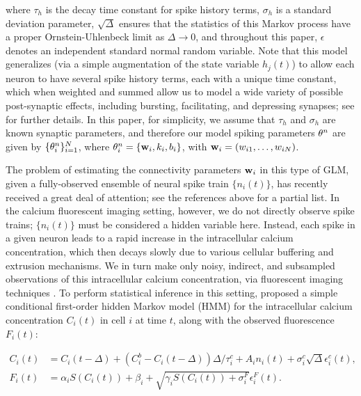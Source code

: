 where $\tau_h$ is the decay time constant for spike history terms, $\sigma_h$ is a standard deviation parameter, $\sqrt{\Delta}$ ensures that the statistics of this Markov process have a proper Ornstein-Uhlenbeck limit as $\Delta \to 0$, and throughout this paper, $\epsilon$ denotes an independent standard normal random variable. Note that this model generalizes (via a simple augmentation of the state variable $h_j(t)$) to allow each neuron to have several spike history terms, each with a unique time constant, which when weighted and summed allow us to model a wide variety of possible post-synaptic effects, including bursting, facilitating, and depressing synapses; see \cite{Vogelstein2009} for further details. In this paper, for simplicity, we assume that $\tau_h$ and $\sigma_h$ are known synaptic parameters, and therefore our model spiking parameters $\mathbf{\theta}^n$ are given by $\{\mathbf{\theta}^n_i\}_{i=1}^N$, where $\mathbf{\theta}^n_i=\{\mathbf{w}_i,k_i,b_i\}$, with $\mathbf{w}_i=(w_{i1},\ldots, w_{iN})$.

The problem of estimating the connectivity parameters $\mathbf{w}_i$ in this type of GLM, given a fully-observed ensemble of neural spike train $\{n_i(t)\}$, has recently received a great deal of attention; see the references above for a partial list. In the calcium fluorescent imaging setting, however, we do not directly observe spike trains; $\{n_i(t)\}$ must be considered a hidden variable here. Instead, each spike in a given neuron leads to a rapid increase in the intracellular calcium concentration, which then decays slowly due to various cellular buffering and extrusion mechanisms. We in turn make only noisy, indirect, and subsampled observations of this intracellular calcium concentration, via fluorescent imaging techniques \cite{ImagingManual}. To perform statistical inference in this setting, \cite{Vogelstein2009} proposed a simple conditional first-order hidden Markov model (HMM) for the intracellular calcium concentration $C_i(t)$ in cell $i$ at time $t$, along with the observed fluorescence $F_i(t)$: 

\begin{align} \label{eqn:ca:definition} C_i(t) &= C_i(t-\Delta) + (C_i^b-C_i(t-\Delta)) \Delta/\tau^c_i + A_i n_i(t)+\sigma^c_i \sqrt{\Delta} \epsilon^c_i(t), \\ F_i(t) &= \alpha_i S(C_i(t)) + \beta_i + \sqrt{\gamma_i S(C_i(t)) + \sigma^F_i} \epsilon^F_i(t). \label{eqn:F:definition} 
\end{align} 
	
